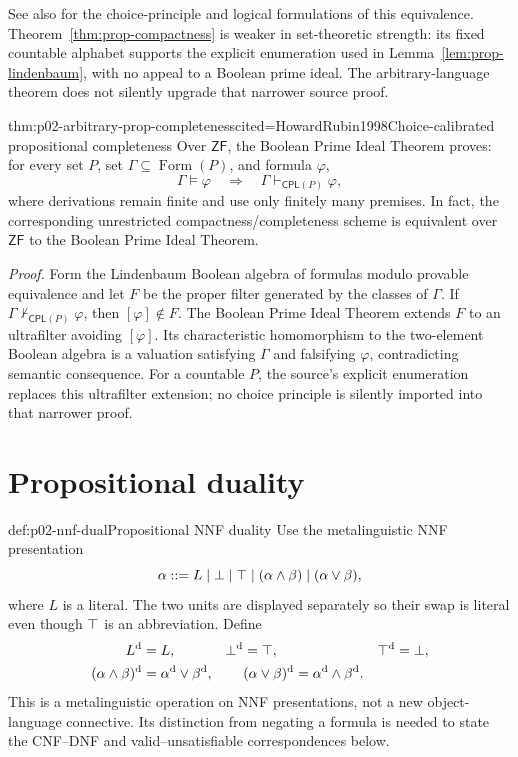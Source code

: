 See also \cite{Jech1973Choice,PaseauLeek2022} for the choice-principle and
logical formulations of this equivalence.  Theorem~\ref{thm:prop-compactness}
is weaker in set-theoretic strength: its fixed countable alphabet supports the
explicit enumeration used in Lemma~\ref{lem:prop-lindenbaum}, with no appeal
to a Boolean prime ideal.  The arbitrary-language theorem does not silently
upgrade that narrower source proof.

\begin{hbtheorem}{thm:p02-arbitrary-prop-completeness}{cited=HowardRubin1998}{Choice-calibrated propositional completeness}
Over \(\mathsf{ZF}\), the Boolean Prime Ideal Theorem proves: for every set
\(P\), set \(\Gamma\subseteq\operatorname{Form}(P)\), and formula \(\varphi\),
\[
 \Gamma\models\varphi\quad\Longrightarrow\quad
 \Gamma\vdash_{\mathsf{CPL}(P)}\varphi,
\]
where derivations remain finite and use only finitely many premises. In fact,
the corresponding unrestricted compactness/completeness scheme is equivalent
over \(\mathsf{ZF}\) to the Boolean Prime Ideal Theorem.
\end{hbtheorem}

\noindent\emph{Proof.}
Form the Lindenbaum Boolean algebra of formulas modulo provable equivalence and
let \(F\) be the proper filter generated by the classes of \(\Gamma\). If
\(\Gamma\nvdash_{\mathsf{CPL}(P)}\varphi\), then \([\varphi]\notin F\). The Boolean Prime Ideal
Theorem extends \(F\) to an ultrafilter avoiding \([\varphi]\). Its
characteristic homomorphism to the two-element Boolean algebra is a valuation
satisfying \(\Gamma\) and falsifying \(\varphi\), contradicting semantic
consequence. For a countable \(P\), the source's explicit enumeration replaces
this ultrafilter extension; no choice principle is silently imported into that
narrower proof.

\section{Propositional duality}
\label{sec:p02-propositional-duality}

\begin{hbdefinition}{def:p02-nnf-dual}{Propositional NNF duality}
Use the metalinguistic NNF presentation
\[
 \alpha ::= L\mid\bot\mid\top\mid(\alpha\land\beta)
             \mid(\alpha\lor\beta),
\]
where \(L\) is a literal.  The two units are displayed separately so their
swap is literal even though \(\top\) is an abbreviation.  Define
\[
\begin{aligned}
 L^{\mathrm d}&=L,&
 \bot^{\mathrm d}&=\top,&
 \top^{\mathrm d}&=\bot,\\
 (\alpha\land\beta)^{\mathrm d}
   &=\alpha^{\mathrm d}\lor\beta^{\mathrm d},&&
 (\alpha\lor\beta)^{\mathrm d}
   =\alpha^{\mathrm d}\land\beta^{\mathrm d}.
\end{aligned}
\]
This is a metalinguistic operation on NNF presentations, not a new
object-language connective.  Its distinction from negating a formula is
needed to state the CNF--DNF and valid--unsatisfiable correspondences below.
\end{hbdefinition}

